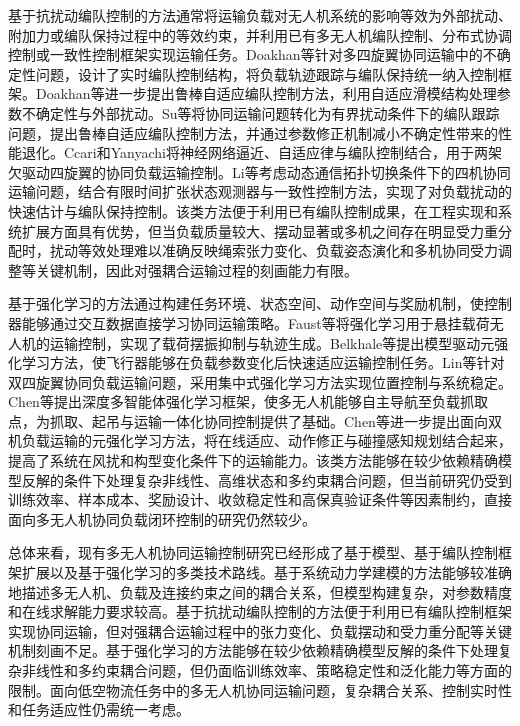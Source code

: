 基于抗扰动编队控制的方法通常将运输负载对无人机系统的影响等效为外部扰动、附加力或编队保持过程中的等效约束，并利用已有多无人机编队控制、分布式协调控制或一致性控制框架实现运输任务。Doakhan等针对多四旋翼协同运输中的不确定性问题，设计了实时编队控制结构，将负载轨迹跟踪与编队保持统一纳入控制框架\cite{doakhan2023realtime}。Doakhan等进一步提出鲁棒自适应编队控制方法，利用自适应滑模结构处理参数不确定性与外部扰动\cite{doakhan2023robust}。Su等将协同运输问题转化为有界扰动条件下的编队跟踪问题，提出鲁棒自适应编队控制方法，并通过参数修正机制减小不确定性带来的性能退化\cite{su2023robust}。Ccari和Yanyachi将神经网络逼近、自适应律与编队控制结合，用于两架欠驱动四旋翼的协同负载运输控制\cite{ccari2023novel}。Li等考虑动态通信拓扑切换条件下的四机协同运输问题，结合有限时间扩张状态观测器与一致性控制方法，实现了对负载扰动的快速估计与编队保持控制\cite{li2026formation}。该类方法便于利用已有编队控制成果，在工程实现和系统扩展方面具有优势，但当负载质量较大、摆动显著或多机之间存在明显受力重分配时，扰动等效处理难以准确反映绳索张力变化、负载姿态演化和多机协同受力调整等关键机制，因此对强耦合运输过程的刻画能力有限。

基于强化学习的方法通过构建任务环境、状态空间、动作空间与奖励机制，使控制器能够通过交互数据直接学习协同运输策略。Faust等将强化学习用于悬挂载荷无人机的运输控制，实现了载荷摆振抑制与轨迹生成\cite{faust2017automated}。Belkhale等提出模型驱动元强化学习方法，使飞行器能够在负载参数变化后快速适应运输控制任务\cite{belkhale2021model}。Lin等针对双四旋翼协同负载运输问题，采用集中式强化学习方法实现位置控制与系统稳定\cite{lin2024payload}。Chen等提出深度多智能体强化学习框架，使多无人机能够自主导航至负载抓取点，为抓取、起吊与运输一体化协同控制提供了基础\cite{chen2023deep}。Chen等进一步提出面向双机负载运输的元强化学习方法，将在线适应、动作修正与碰撞感知规划结合起来，提高了系统在风扰和构型变化条件下的运输能力\cite{chen2025meta}。该类方法能够在较少依赖精确模型反解的条件下处理复杂非线性、高维状态和多约束耦合问题，但当前研究仍受到训练效率、样本成本、奖励设计、收敛稳定性和高保真验证条件等因素制约，直接面向多无人机协同负载闭环控制的研究仍然较少。

总体来看，现有多无人机协同运输控制研究已经形成了基于模型、基于编队控制框架扩展以及基于强化学习的多类技术路线。基于系统动力学建模的方法能够较准确地描述多无人机、负载及连接约束之间的耦合关系，但模型构建复杂，对参数精度和在线求解能力要求较高。基于抗扰动编队控制的方法便于利用已有编队控制框架实现协同运输，但对强耦合运输过程中的张力变化、负载摆动和受力重分配等关键机制刻画不足。基于强化学习的方法能够在较少依赖精确模型反解的条件下处理复杂非线性和多约束耦合问题，但仍面临训练效率、策略稳定性和泛化能力等方面的限制。面向低空物流任务中的多无人机协同运输问题，复杂耦合关系、控制实时性和任务适应性仍需统一考虑。


